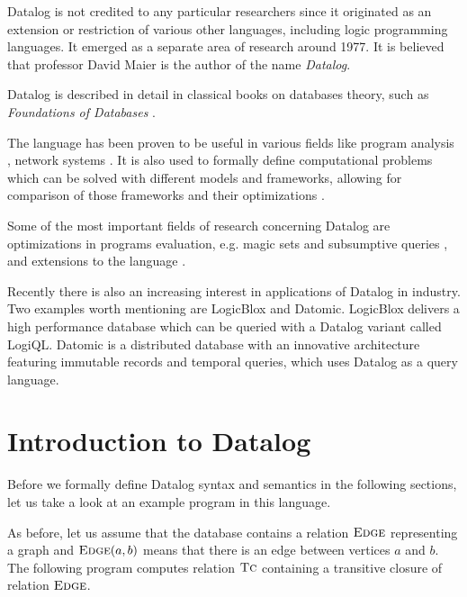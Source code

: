 Datalog is not credited to any particular researchers since it originated as an extension or restriction of various other languages, including logic programming languages. It emerged as a separate area of research around 1977. It is believed that professor David Maier is the author of the name \emph{Datalog}.

Datalog is described in detail in classical books on databases theory, such as \emph{Foundations of Databases} \cite{fod}.

The language has been proven to be useful in various fields like program analysis \cite{pointanalysis}, network systems \cite{boomanalysis, dataloganalysis}. It is also used to formally define computational problems which can be solved with different models and frameworks, allowing for comparison of those frameworks and their optimizations \cite{ullman}. 

Some of the most important fields of research concerning Datalog are optimizations in programs evaluation, e.g. magic sets \cite{magicsets} and subsumptive queries \cite{subsumptivequeries}, and extensions to the language \cite{magicsetsexist, disjunctivedatalog, datalogrelaunched}.

Recently there is also an increasing interest in applications of Datalog in industry. Two examples worth mentioning are LogicBlox and Datomic. LogicBlox \cite{logicblox} delivers a high performance database which can be queried with a Datalog variant called LogiQL.  Datomic \cite{datomic} is a distributed database with an innovative architecture featuring immutable records and temporal queries, which uses Datalog as a query language.

\section{Introduction to Datalog}

Before we formally define Datalog syntax and semantics in the following sections, let us take a look at an example program in this language.

As before, let us assume that the database contains a relation $\textsc{Edge}$ representing a graph and $\textsc{Edge}(a, b)$ means that there is an edge between vertices $a$ and $b$. The following program computes relation $\textsc{Tc}$ containing a transitive closure of relation $\textsc{Edge}$.


